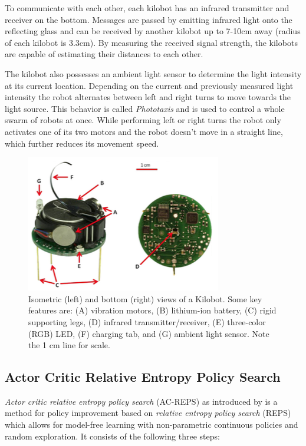 \documentclass[twoside]{article}
\begin{document}
To communicate with each other, each kilobot has an infrared transmitter and
receiver on the bottom. Messages are passed by emitting infrared light onto the
reflecting glass and can be received by another kilobot up to 7-10cm away
(radius of each kilobot is 3.3cm). By measuring the received signal strength,
the kilobots are capable of estimating their distances to each other.

The kilobot also possesses an ambient light sensor to determine the light
intensity at its current location. Depending on the current and previously
measured light intensity the robot alternates between left and right turns to
move towards the light source. This behavior is called \emph{Phototaxis} and is
used to control a whole swarm of robots at once. While performing left or right
turns the robot only activates one of its two motors and the robot doesn't move
in a straight line, which further reduces its movement speed.

\begin{figure}[!htb]
    \centering
    \includegraphics[width=0.9\linewidth]{figures/kilobot.png}
    \caption{Isometric (left) and bottom (right) views of a Kilobot. Some key
        features are: (A) vibration motors, (B) lithium-ion battery, (C) rigid
        supporting legs, (D) infrared transmitter/receiver, (E) three-color
        (RGB) LED, (F) charging tab, and (G) ambient light sensor. Note the 1 cm
        line for scale.\cite{kilobot}}
\end{figure}

\subsection{Actor Critic Relative Entropy Policy Search}
\emph{Actor critic relative entropy policy search} (AC-REPS) as introduced by
\cite{acreps} is a method for policy improvement based on \emph{relative entropy
policy search} (REPS) \cite{reps} which allows for model-free learning with
non-parametric continuous policies and random exploration. It consists of the
following three steps:
\end{document}
